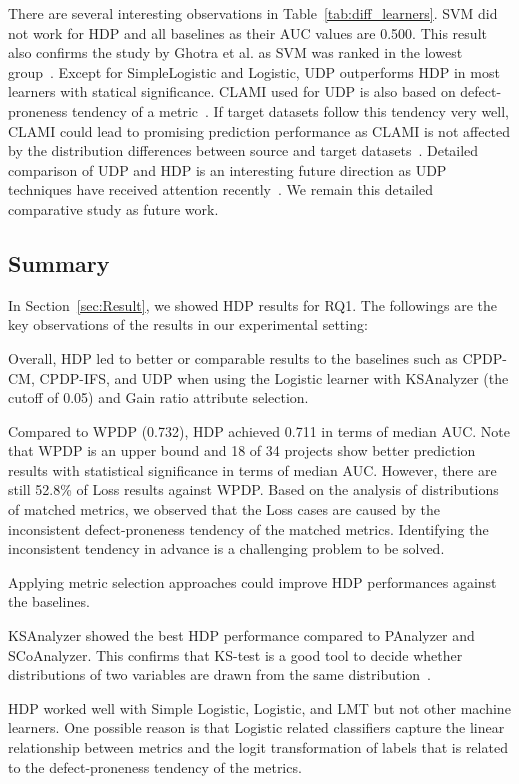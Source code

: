 There are several interesting observations in Table~\ref{tab:diff_learners}. SVM did not work for HDP and all baselines as their AUC values are 0.500.
This result also confirms the study by Ghotra et al. as SVM was ranked in the lowest group~\cite{Ghotra15}. Except for SimpleLogistic and Logistic, UDP outperforms HDP in most learners with statical significance. CLAMI used for UDP is also based on defect-proneness tendency of a metric~\cite{nam2015clami}. If target datasets follow this tendency very well, CLAMI could lead to promising prediction performance as CLAMI is not affected by the distribution differences between source and target datasets~\cite{nam2015clami}. Detailed comparison of UDP and HDP is an interesting future direction as UDP techniques have received attention recently~\cite{nam2015clami,Zhang2016ICSE,Yang2016FSE}. We remain this detailed comparative study as future work.

\subsection{Summary}
In Section~\ref{sec:Result}, we showed HDP results for RQ1. The followings are the key observations of the results in our experimental setting:
\squishlist
    \item Overall, HDP led to better or comparable results to the baselines such as CPDP-CM, CPDP-IFS, and UDP when using the Logistic learner with KSAnalyzer (the cutoff of 0.05) and Gain ratio attribute selection.
    \item Compared to WPDP (0.732), HDP achieved 0.711 in terms of median AUC. Note that WPDP is an upper bound and 18 of 34 projects show better prediction results with statistical significance in terms of median AUC. However, there are still 52.8\% of Loss results against WPDP. Based on the analysis of distributions of matched metrics, we observed that the Loss cases are caused by the inconsistent defect-proneness tendency of the matched metrics. Identifying the inconsistent tendency in advance is a challenging problem to be solved.
    \item Applying metric selection approaches could improve HDP performances against the baselines.
    \item KSAnalyzer showed the best HDP performance compared to PAnalyzer and SCoAnalyzer. This confirms that KS-test is a good tool to decide whether distributions of two variables are drawn from the same distribution~\cite{Lilliefors67,Massey51}.
    \item HDP worked well with Simple Logistic, Logistic, and LMT but not other machine learners. One possible reason is that Logistic related classifiers capture the linear relationship between metrics and the logit transformation of labels that is related to the defect-proneness tendency of the metrics.
\squishend


